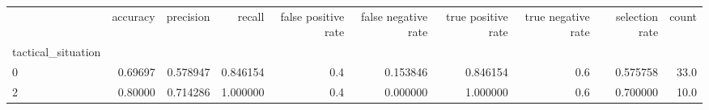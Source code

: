 \begin{tabular}{lrrrrrrrrr}
\toprule
{} &  accuracy &  precision &    recall &  false positive rate &  false negative rate &  true positive rate &  true negative rate &  selection rate &  count \\
tactical\_situation &           &            &           &                      &                      &                     &                     &                 &        \\
\midrule
0                  &   0.69697 &   0.578947 &  0.846154 &                  0.4 &             0.153846 &            0.846154 &                 0.6 &        0.575758 &   33.0 \\
2                  &   0.80000 &   0.714286 &  1.000000 &                  0.4 &             0.000000 &            1.000000 &                 0.6 &        0.700000 &   10.0 \\
\bottomrule
\end{tabular}
